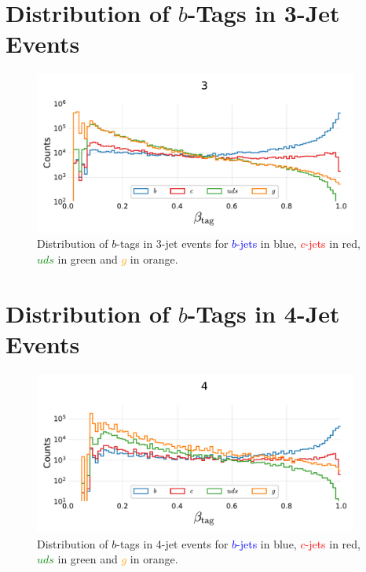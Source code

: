 \section[Distribution of b-Tags in 3-Jet Events]{Distribution of $b$-Tags in 3-Jet Events}
\begin{figure}[h!]
    \centerfloat
    \includegraphics[width=0.95\textwidth, trim=15 15 15 50, clip]{figures/quarks/btag_scores_histogram_-njet=3-down_sample=1.00-ML_vars=vertex-selection=b-ejet_min=4-n_iter_RS_lgb=99-n_iter_RS_xgb=9-cdot_cut=0.90-version=19.pdf}
    \caption[Distribution of $b$-Tags in 3-Jet Events]
            {Distribution of $b$-tags in 3-jet events for \textcolor{blue}{$b$-jets} in blue, \textcolor{red}{$c$-jets} in red, \textcolor{green}{$uds$} in green and \textcolor{orange}{$g$} in orange.} 
    \label{fig:q:btag_histogram_3j}
\end{figure}
\vspace{2cm}
\section[Distribution of b-Tags in 4-Jet Events]{Distribution of $b$-Tags in 4-Jet Events}
\begin{figure}[h!]
    \centerfloat
    \includegraphics[width=0.95\textwidth, trim=15 15 15 50, clip]{figures/quarks/btag_scores_histogram_-njet=4-down_sample=1.00-ML_vars=vertex-selection=b-ejet_min=4-n_iter_RS_lgb=99-n_iter_RS_xgb=9-cdot_cut=0.90-version=19.pdf}
    \caption[Distribution of $b$-Tags in 4-Jet Events]
            {Distribution of $b$-tags in 4-jet events for \textcolor{blue}{$b$-jets} in blue, \textcolor{red}{$c$-jets} in red, \textcolor{green}{$uds$} in green and \textcolor{orange}{$g$} in orange.} 
\end{figure}
\clearpage


